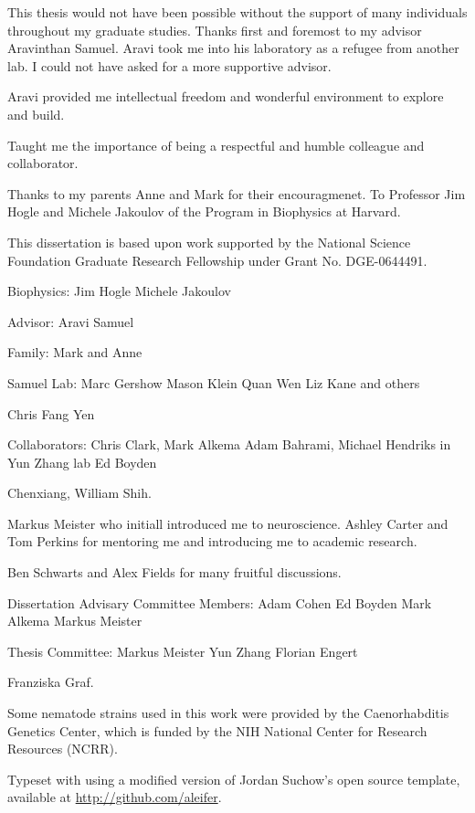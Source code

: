 
This thesis would not have been possible without the support of many individuals throughout my graduate studies. Thanks first and foremost to my advisor Aravinthan Samuel. Aravi took me into his laboratory as a refugee from another lab. I could not have asked for a more supportive advisor. 

Aravi provided me intellectual freedom and wonderful environment to explore and build.

Taught me the importance of being a respectful and humble colleague and collaborator. 





Thanks to my parents Anne and Mark for their encouragmenet. To Professor Jim Hogle and Michele Jakoulov of the Program in Biophysics at Harvard. 

This dissertation is based upon work supported by the National Science Foundation Graduate Research Fellowship under Grant No. DGE-0644491.

Biophysics:
  Jim Hogle
  Michele Jakoulov

Advisor:
  Aravi Samuel

Family:
  Mark and Anne

Samuel Lab:
  Marc Gershow
  Mason Klein
  Quan Wen
  Liz Kane and others

Chris Fang Yen

Collaborators:
   Chris Clark, Mark Alkema
   Adam Bahrami, Michael Hendriks in Yun Zhang lab
   Ed Boyden

Chenxiang, William Shih.
   

Markus Meister who initiall introduced me to neuroscience. 
Ashley Carter and Tom Perkins for mentoring me and introducing me to academic research. 

Ben Schwarts and Alex Fields for many fruitful discussions.

Dissertation Advisary Committee Members:
   Adam Cohen
   Ed Boyden
   Mark Alkema
   Markus Meister
   
Thesis Committee:
	Markus Meister
	Yun Zhang
	Florian Engert

Franziska Graf.

Some nematode strains used in this work were provided by the Caenorhabditis Genetics Center, which is funded by the NIH National Center for Research Resources (NCRR).

Typeset with \XeTeX using a modified version of Jordan Suchow's open source template, available at \href{https://github.com/aleifer/LaTeX-template-for-Harvard-dissertation}{http://github.com/aleifer}.